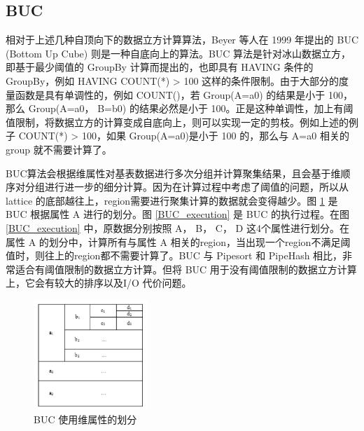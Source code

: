
\subsection{BUC}

相对于上述几种自顶向下的数据立方计算算法，Beyer 等人在 1999 年提出的 BUC (Bottom Up Cube) 则是一种自底向上的算法。BUC 算法是针对冰山数据立方，即基于最少阈值的 GroupBy 计算而提出的，也即具有 HAVING 条件的 GroupBy，例如 HAVING COUNT(*) > 100 这样的条件限制。由于大部分的度量函数是具有单调性的，例如 COUNT()，若 Group(A=a0) 的结果是小于 100，那么 Group(A=a0， B=b0) 的结果必然是小于 100。正是这种单调性，加上有阈值限制，将数据立方的计算变成自底向上，则可以实现一定的剪枝。例如上述的例子 COUNT(*) > 100，如果 Group(A=a0)是小于 100 的，那么与 A=a0 相关的 group 就不需要计算了。

BUC算法会根据维属性对基表数据进行多次分组并计算聚集结果，且会基于维顺序对分组进行进一步的细分计算。因为在计算过程中考虑了阈值的问题，所以从 lattice 的底部越往上，region需要进行聚集计算的数据就会变得越少。图 \ref{BUC_partition} 是 BUC 根据属性 A 进行的划分。图 \ref{BUC_execution} 是 BUC 的执行过程。在图 \ref{BUC_execution} 中，原数据分别按照 A， B， C， D 这4个属性进行划分。在属性 A 的划分中，计算所有与属性 A 相关的region，当出现一个region不满足阈值时，则往上的region都不需要计算了。BUC 与 Pipesort 和 PipeHash 相比，非常适合有阈值限制的数据立方计算。但将 BUC 用于没有阈值限制的数据立方计算上，它会有较大的排序以及I/O 代价问题。

\begin{figure}[!htb]
\centering\includegraphics[width=1.7in]{picture/ch_current_research/BUC_partition} 
\caption{BUC 使用维属性的划分}\label{BUC_partition} 
\end{figure} 


